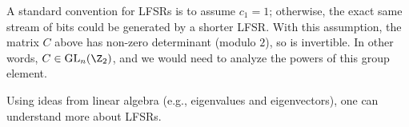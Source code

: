 \documentclass[12pt]{amsart}
\DeclareMathOperator{\GL}{GL}
\theoremstyle{plain}
\theoremstyle{definition}
\theoremstyle{remark}
\begin{document}
A standard convention for LFSRs is to assume $c_1=1$; otherwise, the
exact same stream of bits could be generated by a shorter LFSR.  With
this assumption, the matrix $C$ above has non-zero determinant (modulo
$2$), so is invertible.  In other words, $C\in \GL_n(\Z_2)$, and we
would need to analyze the powers of this group element.

Using ideas from linear algebra (e.g., eigenvalues and eigenvectors),
one can understand more about LFSRs.







\begin{comment}
\newpage
\section{Rest}

\begin{itemize}
\item Examples: additive groups
\item Examples: multiplicative groups
\item Integers mod $n$
\begin{itemize}
\item Connect congruences to congruence classes to working with
  remainders
\item Both additive and multiplicative groups
\end{itemize}
\item Cyclic subgroups
\item Order of an element and basic facts about powers
\item Connect to shift cipher
\item Related to RSA
\item Connected to $p-1$ factorization
\item $GL_n(\Zn)$ and Hill cipher
\item Products of groups
\item Isomorphisms ($\R$ and $\R^+$)
\item Structure of finite abelian groups -- compare with text
\end{itemize}


\section{Elliptic curves}
\begin{itemize}
\item Cannonball problem, square base, total is a square:
\[ \sum_{j=1}^n j^2 = k^2\]
or
\[ \frac{j(j+1)(2j+1)}{6} = k^2\]


\end{comment}
\end{document}
